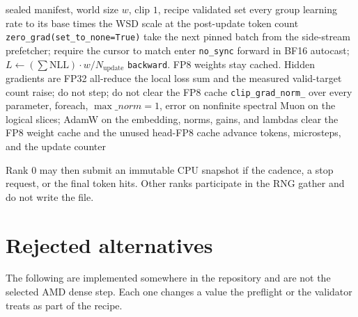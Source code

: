 \documentclass[11pt]{article}
\DeclareRobustCommand{\code}[1]{\texttt{#1}}
\begin{document}
\begin{algorithm}[t]
\caption{One optimizer update on a rank. Only the last microstep all-reduces.}
\label{alg:step}
\begin{algorithmic}[1]
\Require sealed manifest, world size \(w\), clip \(1\), recipe validated
\State set every group learning rate to its base times the WSD scale at the post-update token count
\State \code{zero\_grad(set\_to\_none=True)}
  \State take the next pinned batch from the side-stream prefetcher; require the cursor to match
   enter \code{no\_sync} \EndIf
  \State forward in BF16 autocast; \(L \leftarrow (\sum \mathrm{NLL})\cdot w/N_{\mathrm{update}}\)
  \State \code{backward}. FP8 weights stay cached. Hidden gradients are FP32
\EndFor
\State all-reduce the local loss sum and the measured valid-target count
  \State raise; do not step; do not clear the FP8 cache
\EndIf
\State \code{clip\_grad\_norm\_} over every parameter, foreach, \(\max\_norm=1\), error on nonfinite
\State spectral Muon on the logical slices; AdamW on the embedding, norms, gains, and lambdas
\State clear the FP8 weight cache and the unused head-FP8 cache
\State advance tokens, microsteps, and the update counter
\end{algorithmic}
\end{algorithm}

Rank \(0\) may then submit an immutable CPU snapshot if the cadence, a stop
request, or the final token hits. Other ranks participate in the RNG gather
and do not write the file.

\section{Rejected alternatives}

The following are implemented somewhere in the repository and are not the
selected AMD dense step. Each one changes a value the preflight or the
validator treats as part of the recipe.
\end{document}
